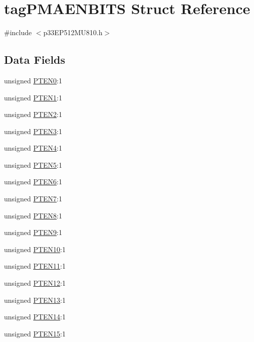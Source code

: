 \hypertarget{structtag_p_m_a_e_n_b_i_t_s}{}\section{tag\+P\+M\+A\+E\+N\+B\+I\+TS Struct Reference}
\label{structtag_p_m_a_e_n_b_i_t_s}


{\ttfamily \#include $<$p33\+E\+P512\+M\+U810.\+h$>$}

\subsection*{Data Fields}
\begin{DoxyCompactItemize}
\item 
unsigned \hyperlink{structtag_p_m_a_e_n_b_i_t_s_a0e03e6ebdb6efe7f88e755a9b565e71f}{P\+T\+E\+N0}\+:1
\item 
unsigned \hyperlink{structtag_p_m_a_e_n_b_i_t_s_a0b82117df97c612fc89a2723eb5bc2b4}{P\+T\+E\+N1}\+:1
\item 
unsigned \hyperlink{structtag_p_m_a_e_n_b_i_t_s_a902b9df9cd9c468f1c112693f8d564a2}{P\+T\+E\+N2}\+:1
\item 
unsigned \hyperlink{structtag_p_m_a_e_n_b_i_t_s_a1644568e7a2d4d67993e2b7f9aa79d27}{P\+T\+E\+N3}\+:1
\item 
unsigned \hyperlink{structtag_p_m_a_e_n_b_i_t_s_a63e765c78e92b2305e650391e19f54fc}{P\+T\+E\+N4}\+:1
\item 
unsigned \hyperlink{structtag_p_m_a_e_n_b_i_t_s_ab40e24b0841cadc6ca79d30765d09306}{P\+T\+E\+N5}\+:1
\item 
unsigned \hyperlink{structtag_p_m_a_e_n_b_i_t_s_a688d7677c536efb5820c1260bd75d92d}{P\+T\+E\+N6}\+:1
\item 
unsigned \hyperlink{structtag_p_m_a_e_n_b_i_t_s_aea7491fa7ad36ac0226ee62ea41865cf}{P\+T\+E\+N7}\+:1
\item 
unsigned \hyperlink{structtag_p_m_a_e_n_b_i_t_s_a20da875da2502520dfd35385782f36d6}{P\+T\+E\+N8}\+:1
\item 
unsigned \hyperlink{structtag_p_m_a_e_n_b_i_t_s_a1b5624a087b9ca15d798955ca5b37a8c}{P\+T\+E\+N9}\+:1
\item 
unsigned \hyperlink{structtag_p_m_a_e_n_b_i_t_s_a1e0e2bdbdef904c334d292c9b9852303}{P\+T\+E\+N10}\+:1
\item 
unsigned \hyperlink{structtag_p_m_a_e_n_b_i_t_s_aff4048c4c57eea1fb3dfb40b5285de54}{P\+T\+E\+N11}\+:1
\item 
unsigned \hyperlink{structtag_p_m_a_e_n_b_i_t_s_a188b9a63608b48e29156a54b3fb4f1e4}{P\+T\+E\+N12}\+:1
\item 
unsigned \hyperlink{structtag_p_m_a_e_n_b_i_t_s_a17e59a603c684422ac318018090311df}{P\+T\+E\+N13}\+:1
\item 
unsigned \hyperlink{structtag_p_m_a_e_n_b_i_t_s_aff9562cacc4361ac6ef2bf20ac0e488f}{P\+T\+E\+N14}\+:1
\item 
unsigned \hyperlink{structtag_p_m_a_e_n_b_i_t_s_aa6bd5f68f971c8ee5c7ca100f1007e80}{P\+T\+E\+N15}\+:1
\end{DoxyCompactItemize}


